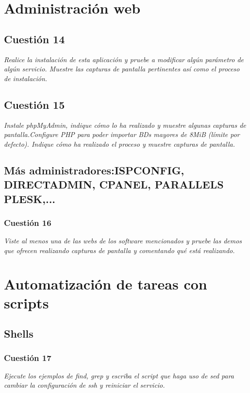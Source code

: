 \section{Administración web}
\subsection{Cuestión 14}
\textit{Realice la instalación de esta aplicación y pruebe a modificar algún parámetro de algún servicio. Muestre las capturas de pantalla pertinentes así como el proceso de instalación.}

\subsection{Cuestión 15}
\textit{Instale phpMyAdmin, indique cómo lo ha realizado y muestre algunas capturas de pantalla.Configure PHP para poder importar BDs mayores de 8MiB (límite por defecto). Indique cómo ha realizado el proceso y muestre capturas de pantalla.}


\subsection{Más administradores:ISPCONFIG, DIRECTADMIN, CPANEL, PARALLELS PLESK,... }
\subsubsection{Cuestión 16}
\textit{Viste al menos una de las webs de los software mencionados y pruebe las demos que ofrecen realizando capturas de pantalla y comentando qué está realizando.}


\section{Automatización de tareas con scripts}
\subsection{Shells}
\subsubsection{Cuestión 17}
\textit{Ejecute los ejemplos de find, grep y escriba el script que haga uso de sed para cambiar la configuración de ssh y reiniciar el servicio.}

